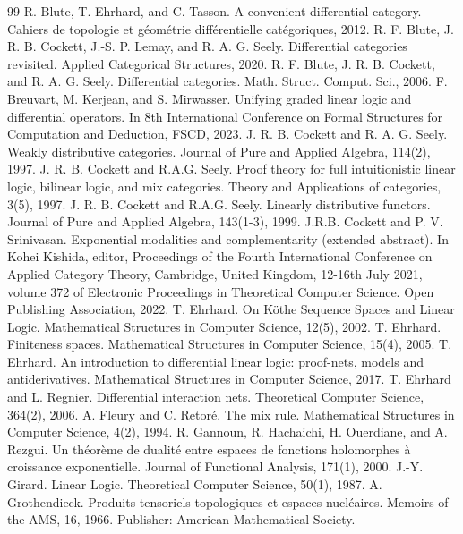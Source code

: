 \documentclass[10pt,a4paper]{amsart}
\begin{document}
\begin{thebibliography}{99}
 R. Blute, T. Ehrhard, and C. Tasson. A convenient differential category. Cahiers de topologie et géométrie différentielle catégoriques, 2012.
 R. F. Blute, J. R. B. Cockett, J.-S. P. Lemay, and R. A. G. Seely. Differential categories revisited. Applied Categorical Structures, 2020.
 R. F. Blute, J. R. B. Cockett, and R. A. G. Seely. Differential categories. Math. Struct. Comput. Sci., 2006.
 F. Breuvart, M. Kerjean, and S. Mirwasser. Unifying graded linear logic and differential operators. In 8th International Conference on Formal Structures for Computation and Deduction, FSCD, 2023.
 J. R. B. Cockett and R. A. G. Seely. Weakly distributive categories. Journal of Pure and Applied Algebra, 114(2), 1997.
 J. R. B. Cockett and R.A.G. Seely. Proof theory for full intuitionistic linear logic, bilinear logic, and mix categories. Theory and Applications of categories, 3(5), 1997.
 J. R. B. Cockett and R.A.G. Seely. Linearly distributive functors. Journal of Pure and Applied Algebra, 143(1-3), 1999.
 J.R.B. Cockett and P. V. Srinivasan. Exponential modalities and complementarity (extended abstract). In Kohei Kishida, editor, Proceedings of the Fourth International Conference on Applied Category Theory, Cambridge, United Kingdom, 12-16th July 2021, volume 372 of Electronic Proceedings in Theoretical Computer Science. Open Publishing Association, 2022.
 T. Ehrhard. On Köthe Sequence Spaces and Linear Logic. Mathematical Structures in Computer Science, 12(5), 2002.
 T. Ehrhard. Finiteness spaces. Mathematical Structures in Computer Science, 15(4), 2005.
 T. Ehrhard. An introduction to differential linear logic: proof-nets, models and antiderivatives. Mathematical Structures in Computer Science, 2017.
 T. Ehrhard and L. Regnier. Differential interaction nets. Theoretical Computer Science, 364(2), 2006.
 A. Fleury and C. Retoré. The mix rule. Mathematical Structures in Computer Science, 4(2), 1994.
 R. Gannoun, R. Hachaichi, H. Ouerdiane, and A. Rezgui. Un théorème de dualité entre espaces de fonctions holomorphes à croissance exponentielle. Journal of Functional Analysis, 171(1), 2000.
 J.-Y. Girard. Linear Logic. Theoretical Computer Science, 50(1), 1987.
 A. Grothendieck. Produits tensoriels topologiques et espaces nucléaires. Memoirs of the AMS, 16, 1966. Publisher: American Mathematical Society.

\end{thebibliography}
\end{document}
